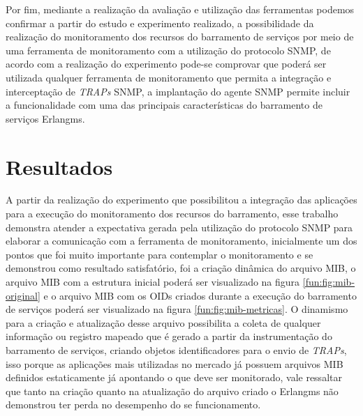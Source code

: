 Por fim, mediante a realização da avaliação e utilização das ferramentas podemos confirmar a partir do estudo e experimento realizado, a possibilidade da realização do monitoramento dos recursos do barramento de serviços por meio de uma ferramenta de monitoramento com a utilização do protocolo \acrshort{SNMP}, de acordo com a realização do experimento pode-se comprovar que poderá ser utilizada qualquer ferramenta de monitoramento que permita a integração e interceptação de \textit{TRAPs} \acrshort{SNMP}, a implantação do agente \acrshort{SNMP} permite incluir a funcionalidade com uma das principais características do barramento de serviços Erlangms.   



\section{Resultados}
\label{resultados}

A partir da realização do experimento que possibilitou a integração das aplicações para a execução do monitoramento dos recursos do barramento, esse trabalho demonstra atender a expectativa gerada pela utilização do protocolo \acrshort{SNMP} para elaborar a comunicação com a ferramenta de monitoramento, inicialmente um dos pontos que foi muito importante para contemplar o monitoramento e se demonstrou como resultado satisfatório, foi a criação dinâmica do arquivo MIB, o arquivo MIB com a estrutura inicial poderá ser visualizado na figura \ref{fun:fig:mib-original} e o arquivo MIB com os \acrshort{OID}s criados durante a execução do barramento de serviços poderá ser visualizado na figura \ref{fun:fig:mib-metricas}. O dinamismo para a criação e atualização desse arquivo possibilita a coleta de qualquer informação ou registro mapeado que é gerado a partir da instrumentação do barramento de serviços, criando objetos identificadores para o envio de \textit{TRAPs}, isso porque as aplicações mais utilizadas no mercado já possuem arquivos MIB definidos estaticamente já apontando o que deve ser monitorado, vale ressaltar que tanto na criação quanto na atualização do arquivo criado o Erlangms não demonstrou ter perda no desempenho do se funcionamento.

